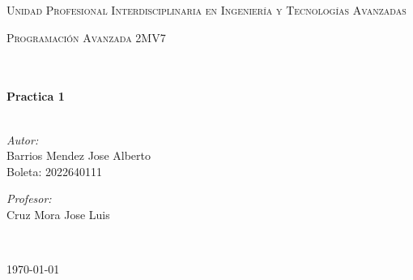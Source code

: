 \documentclass[12pt]{article}
\begin{document}
\begin{center}
\textsc{\LARGE Unidad Profesional Interdisciplinaria en Ingenier\'ia y				%
Tecnolog\'ias Avanzadas}\\[1.5cm]													%

\begin{minipage}{0.9\textwidth} 
\begin{center}																					%
\textsc{\LARGE Programación Avanzada 2MV7}
\end{center}
\end{minipage}\\[0.5cm]
 			\vspace*{1cm}																		%
\HRule \\[0.4cm]																	%
{ \huge \bfseries Practica 1}\\[0.4cm]	%
\HRule \\[1.5cm]																	%
\begin{minipage}{0.46\textwidth}													%
\begin{flushleft} \large															%
\emph{Autor:}\\	
Barrios Mendez Jose Alberto\\
Boleta: 2022640111


\end{flushleft}																		%
\end{minipage}		
\begin{minipage}{0.52\textwidth}		
\vspace{-0.6cm}											%
\begin{flushright} \large															%
\emph{Profesor:} \\																	%
Cruz Mora Jose Luis\\
\end{flushright}																	%
\end{minipage}	
\vspace*{1cm}
 	
 		\\																		%
\vspace{2cm} 																				
\begin{center}																					
{\large \today}																	%
 			\end{center}												  						
\end{center}							 											
																					
\end{document}
